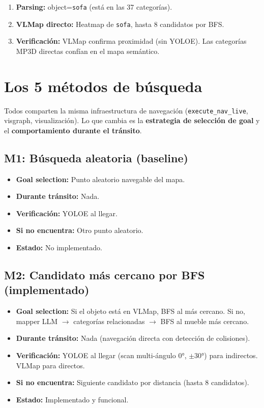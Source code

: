 \documentclass[11pt,a4paper]{article}
\begin{document}
\begin{enumerate}
    \item \textbf{Parsing:} object=\texttt{sofa} (está en las 37 categorías).
    \item \textbf{VLMap directo:} Heatmap de \texttt{sofa}, hasta 8 candidatos por BFS.
    \item \textbf{Verificación:} VLMap confirma proximidad (sin YOLOE). Las categorías MP3D directas confían en el mapa semántico.
\end{enumerate}

\section{Los 5 métodos de búsqueda}

Todos comparten la misma infraestructura de navegación (\texttt{execute\_nav\_live}, visgraph, visualización). Lo que cambia es la \textbf{estrategia de selección de goal} y el \textbf{comportamiento durante el tránsito}.

\subsection{M1: Búsqueda aleatoria (baseline)}
\begin{itemize}
    \item \textbf{Goal selection:} Punto aleatorio navegable del mapa.
    \item \textbf{Durante tránsito:} Nada.
    \item \textbf{Verificación:} YOLOE al llegar.
    \item \textbf{Si no encuentra:} Otro punto aleatorio.
    \item \textbf{Estado:} \textcolor{notdone}{No implementado.}
\end{itemize}

\subsection{M2: Candidato más cercano por BFS (implementado)}
\begin{itemize}
    \item \textbf{Goal selection:} Si el objeto está en VLMap, BFS al más cercano. Si no, mapper LLM $\rightarrow$ categorías relacionadas $\rightarrow$ BFS al mueble más cercano.
    \item \textbf{Durante tránsito:} Nada (navegación directa con detección de colisiones).
    \item \textbf{Verificación:} YOLOE al llegar (scan multi-ángulo 0°, $\pm$30°) para indirectos. VLMap para directos.
    \item \textbf{Si no encuentra:} Siguiente candidato por distancia (hasta 8 candidatos).
    \item \textbf{Estado:} \textcolor{done}{Implementado y funcional.}
\end{itemize}
\end{document}
